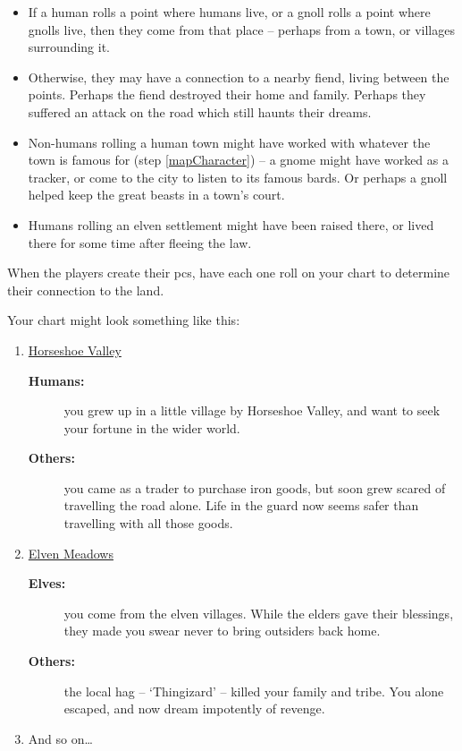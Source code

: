 \begin{multicols}{2}
\begin{itemize}
  \item
  If a human rolls a point where humans live, or a gnoll rolls a point where gnolls live, then they come from that place -- perhaps from a town, or \glspl{village} surrounding it.
  \item
  Otherwise, they may have a connection to a nearby fiend, living between the points.
  Perhaps the fiend destroyed their home and family.
  Perhaps they suffered an attack on the road which still haunts their dreams.
  \item
  Non-humans rolling a human town might have worked with whatever the town is famous for (step \vref{mapCharacter}) -- a gnome might have worked as a tracker, or come to the city to listen to its famous bards.
  Or perhaps a gnoll helped keep the great beasts in a town's \gls{court}.
  \item
  Humans rolling an elven settlement might have been raised there, or lived there for some time after fleeing the law.
\end{itemize}

When the players create their \glspl{pc}, have each one roll on your chart to determine their connection to the land.

\needspace{8em}
Your chart might look something like this:
\begin{enumerate}
  \item
  \underline{Horseshoe Valley}
  \begin{description}
    \item[\textbf{Humans:}] you grew up in a little \gls{village} by Horseshoe Valley, and want to seek your fortune in the wider world.
    \item[\textbf{Others:}] you came as a trader to purchase iron goods, but soon grew scared of travelling the road alone.
    Life in the \gls{guard} now seems safer than travelling with all those goods.
  \end{description}
  \item
  \underline{Elven Meadows}
  \begin{description}
    \item[\textbf{Elves:}]
    you come from the elven villages.
    While the elders gave their blessings, they made you swear never to bring outsiders back home.
    \item[\textbf{Others:}]
    the local \gls{hag} -- `Thingizard' -- killed your family and tribe.
    You alone escaped, and now dream impotently of revenge.
  \end{description}
  \item
  And so on\ldots
\end{enumerate}

\end{multicols}

